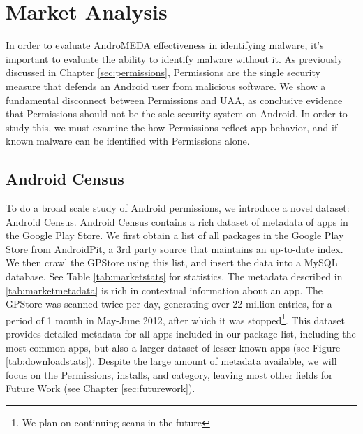 \chapter{Market Analysis}
\label{sec:market}

In order to evaluate AndroMEDA effectiveness in identifying malware, it's important to evaluate the ability to identify malware without it. As previously discussed in Chapter \ref{sec:permissions}, Permissions are the single security measure that defends an Android user from malicious software. We show a fundamental disconnect between Permissions and UAA, as conclusive evidence that Permissions should not be the sole security system on Android. In order to study this, we must examine the how Permissions reflect app behavior, and if known malware can be identified with Permissions alone.








\section{Android Census}
To do a broad scale study of Android permissions, we introduce a novel dataset: Android Census\citep{androidcensus}. Android Census contains a rich dataset of metadata of apps in the Google Play Store. We first obtain a list of all packages in the Google Play Store from AndroidPit\citep{androidpit}, a 3rd party source that maintains an up-to-date index. We then crawl the GPStore using this list, and insert the data into a MySQL database. See Table \ref{tab:marketstats} for statistics. The metadata described in \ref{tab:marketmetadata} is rich in contextual information about an app. The GPStore was scanned twice per day, generating over 22 million entries, for a period of 1 month in May-June 2012, after which it was stopped\footnote{We plan on continuing scans in the future}. This dataset provides detailed metadata for all apps included in our package list, including the most common apps, but also a larger dataset of lesser known apps (see Figure \ref{tab:downloadstats}). Despite the large amount of metadata available, we will focus on the Permissions, installs, and category, leaving most other fields for Future Work (see Chapter \ref{sec:futurework}).


